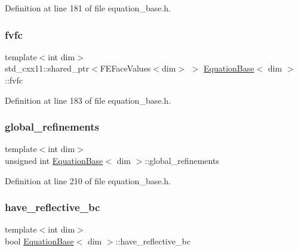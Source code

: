 Definition at line 181 of file equation\+\_\+base.\+h.

\mbox{\label{class_equation_base_a6f6ca8b0e78bcbe0edd07f7967a0a6f9}} 
\subsubsection{\texorpdfstring{fvfc}{fvfc}}
{\footnotesize\ttfamily template$<$int dim$>$ \\
std\+\_\+cxx11\+::shared\+\_\+ptr$<$F\+E\+Face\+Values$<$dim$>$ $>$ \hyperlink{class_equation_base}{Equation\+Base}$<$ dim $>$\+::fvfc\hspace{0.3cm}{\ttfamily [protected]}}



Definition at line 183 of file equation\+\_\+base.\+h.

\mbox{\label{class_equation_base_a9433f3e6cb2251b0b7d0408570677b2e}} 
\subsubsection{\texorpdfstring{global\+\_\+refinements}{global\_refinements}}
{\footnotesize\ttfamily template$<$int dim$>$ \\
unsigned int \hyperlink{class_equation_base}{Equation\+Base}$<$ dim $>$\+::global\+\_\+refinements\hspace{0.3cm}{\ttfamily [protected]}}



Definition at line 210 of file equation\+\_\+base.\+h.

\mbox{\label{class_equation_base_a145ca193add91b43e7a00d6f35c0e1fb}} 
\subsubsection{\texorpdfstring{have\+\_\+reflective\+\_\+bc}{have\_reflective\_bc}}
{\footnotesize\ttfamily template$<$int dim$>$ \\
bool \hyperlink{class_equation_base}{Equation\+Base}$<$ dim $>$\+::have\+\_\+reflective\+\_\+bc\hspace{0.3cm}{\ttfamily [protected]}}



